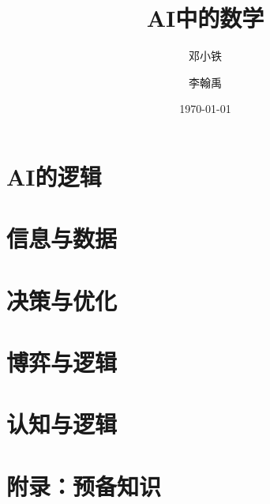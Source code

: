\documentclass[10pt,oneside,fontset=none]{ctexbook}
\title{AI中的数学}
\author{邓小铁}
\author{李翰禹}
\affil{}
\date{\today}
\begin{document}
\frontmatter
\maketitle

\tableofcontents

\mainmatter



\part{AI的逻辑}\label{part:AI-logic}



\part{信息与数据}\label{part:information-data}




\part{决策与优化}\label{part:decision-optimization}




\part{博弈与逻辑}\label{part:logic-game}


\part{认知与逻辑}\label{part:cognitive-logic}



\appendix
\part{附录：预备知识}




\backmatter


\end{document}
